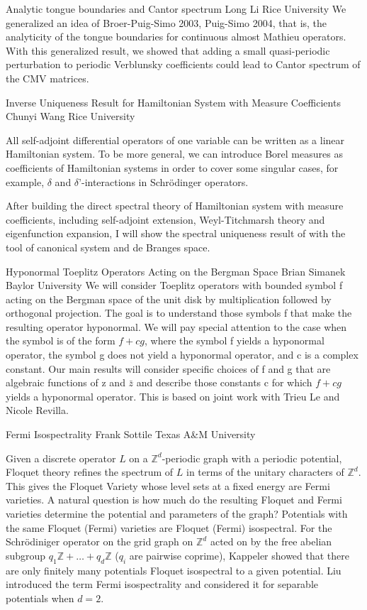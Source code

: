 \begin{addmargin}[2em]{0em}
\vspace{1.5ex}
\abs
{Analytic tongue boundaries and Cantor spectrum}
{Long Li}
{Rice University}
{We generalized an idea of Broer-Puig-Simo 2003, Puig-Simo 2004, that is, the analyticity of the tongue boundaries for continuous almost Mathieu operators. With this generalized result, we showed that adding a small quasi-periodic perturbation to periodic Verblunsky coefficients could lead to Cantor spectrum of the CMV matrices.}


\vspace{1.5ex}
\abs
{Inverse Uniqueness Result for Hamiltonian System with Measure Coefficients}
{Chunyi Wang}
{Rice University}
{All self-adjoint differential operators of one variable can be written as a linear Hamiltonian system. To be more general, we can introduce Borel measures as coefficients of Hamiltonian systems in order to cover some singular cases, for example, $\delta$ and $\delta’$-interactions in Schr\"odinger operators.

After building the direct spectral theory of Hamiltonian system with measure coefficients, including self-adjoint extension, Weyl-Titchmarsh theory and eigenfunction expansion, I will show the spectral uniqueness result of with the tool of canonical system and de Branges space.}


\vspace{1.5ex}
\abs
{Hyponormal Toeplitz Operators Acting on the Bergman Space}
{Brian Simanek}
{Baylor University}
{We will consider Toeplitz operators with bounded symbol f acting on the Bergman space of the unit disk by multiplication followed by orthogonal projection.  The goal is to understand those symbols f that make the resulting operator hyponormal.  We will pay special attention to the case when the symbol is of the form $f+cg$, where the symbol f yields a hyponormal operator, the symbol g does not yield a hyponormal operator, and c is a complex constant.  Our main results will consider specific choices of f and g that are algebraic functions of z and $\bar{z}$ and describe those constants c for which $f+cg$ yields a hyponormal operator.  This is based on joint work with Trieu Le and Nicole Revilla.}


\vspace{1.5ex}
\abs
{Fermi Isospectrality}
{Frank Sottile}
{Texas A\&M University}
{Given a discrete operator $L$ on a $\mathbb{Z}^d$-periodic graph with a periodic potential,
Floquet theory refines the spectrum of $L$ in terms of the unitary characters of
$\mathbb{Z}^d$.  This gives the Floquet Variety whose level sets at a fixed energy are Fermi
varieties.  A natural question is how much do the resulting Floquet and Fermi
varieties determine the potential and parameters of the graph? Potentials with
the same Floquet (Fermi) varieties are Floquet (Fermi) isospectral.  For the
Schr\"odiniger operator on the grid graph on $\mathbb{Z}^d$ acted on by the free abelian
subgroup $q_1\mathbb{Z} + \ldots + q_d \mathbb{Z}$ ($q_i$ are pairwise coprime), Kappeler showed that
there are only finitely many potentials Floquet isospectral to a given
potential.  Liu introduced the term Fermi isospectrality and considered it for
separable potentials when $d=2$.

}
\end{addmargin}
